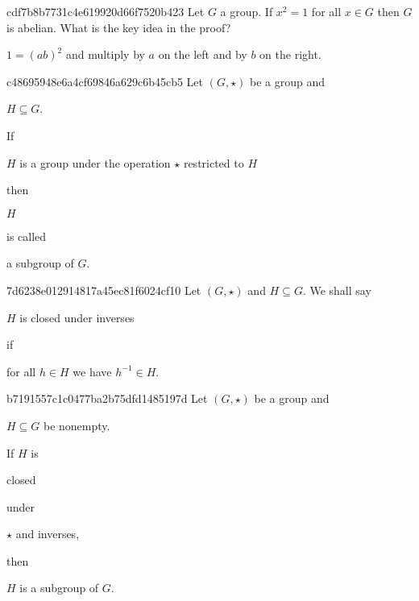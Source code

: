 \begin{note}{cdf7b8b7731c4e619920d66f7520b423}
    Let \({ G }\) a group. If \({ x^2 = 1 }\) for all \({ x \in G }\) then \({ G }\) is abelian.
    What is the key idea in the proof?

    \begin{cloze}{1}
        \({ 1 = (ab)^2 }\) and multiply by \({ a }\) on the left and by \({ b }\) on the right.
    \end{cloze}
\end{note}

\begin{note}{c48695948e6a4cf69846a629c6b45cb5}
    Let \({ (G, \star) }\) be a group and \begin{icloze}{4}\({ H \subseteq G }\).\end{icloze}
    If \begin{icloze}{2}\({ H }\) is a group under the operation \({ \star }\) restricted to \({ H }\)\end{icloze} then \begin{icloze}{3}\({ H }\)\end{icloze} is called \begin{icloze}{1}a subgroup of \({ G }\).\end{icloze}
\end{note}

\begin{note}{7d6238e012914817a45ec81f6024cf10}
    Let \({ (G, \star) }\) and \({ H \subseteq G }\).
    We shall say \begin{icloze}{2}\({ H }\) is closed under inverses\end{icloze} if \begin{icloze}{1}for all \({ h \in H }\) we have \({ h^{-1} \in H }\).\end{icloze}
\end{note}

\begin{note}{b7191557c1c0477ba2b75dfd1485197d}
    Let \({ (G, \star) }\) be a group and \begin{icloze}{4}\({ H \subseteq G }\) be nonempty.\end{icloze}
    If \({ H }\) is \begin{icloze}{3}closed\end{icloze} under \begin{icloze}{2}\({ \star }\) and inverses,\end{icloze} then \begin{icloze}{1}\({ H }\) is a subgroup of \({ G }\).\end{icloze}
\end{note}

